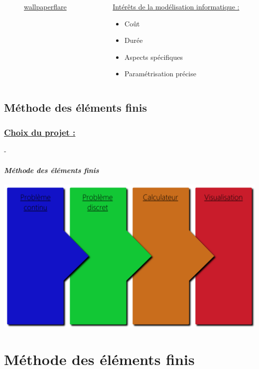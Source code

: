 \documentclass[10pt]{beamer}
\begin{document}
\begin{frame}
\begin{columns}[t]
\begin{column}{5cm}
\begin{figure}
   					\caption{\href{https://www.wallpaperflare.com/black-cables-connection-data-electronics-equipment-ethernet-wallpaper-aryet}{wallpaperflare}}
				\end{figure}
  			\end{column}
 			\begin{column}{5cm}
 				\begin{block}{}
 					\uline{Int\'er\^ets de la mod\'elisation informatique :}
					\begin{itemize}
						\item Co\^ut
						\item Dur\'ee
						\item Aspects sp\'ecifiques
						\item Param\'etrisation pr\'ecise
					\end{itemize}
				\end{block}
			 \end{column}
 		\end{columns}
	\end{frame}
	\subsection{M\'ethode des \'el\'ements finis}
	\begin{frame}
		\frametitle{\uline{Choix du projet :}}-
		\framesubtitle{\textit{M\'ethode des \'el\'ements finis}}
		\centering
		\includegraphics[scale=4.5]{Images/MethodeDesElementsFinis.png}
	\end{frame}

	\section{M\'ethode des \'el\'ements finis}
\end{document}
